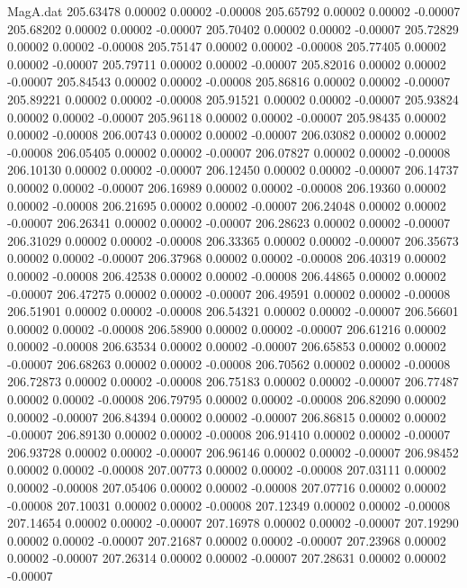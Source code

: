 \begin{filecontents}{MagA.dat}
 205.63478    0.00002    0.00002   -0.00008
 205.65792    0.00002    0.00002   -0.00007
 205.68202    0.00002    0.00002   -0.00007
 205.70402    0.00002    0.00002   -0.00007
 205.72829    0.00002    0.00002   -0.00008
 205.75147    0.00002    0.00002   -0.00008
 205.77405    0.00002    0.00002   -0.00007
 205.79711    0.00002    0.00002   -0.00007
 205.82016    0.00002    0.00002   -0.00007
 205.84543    0.00002    0.00002   -0.00008
 205.86816    0.00002    0.00002   -0.00007
 205.89221    0.00002    0.00002   -0.00008
 205.91521    0.00002    0.00002   -0.00007
 205.93824    0.00002    0.00002   -0.00007
 205.96118    0.00002    0.00002   -0.00007
 205.98435    0.00002    0.00002   -0.00008
 206.00743    0.00002    0.00002   -0.00007
 206.03082    0.00002    0.00002   -0.00008
 206.05405    0.00002    0.00002   -0.00007
 206.07827    0.00002    0.00002   -0.00008
 206.10130    0.00002    0.00002   -0.00007
 206.12450    0.00002    0.00002   -0.00007
 206.14737    0.00002    0.00002   -0.00007
 206.16989    0.00002    0.00002   -0.00008
 206.19360    0.00002    0.00002   -0.00008
 206.21695    0.00002    0.00002   -0.00007
 206.24048    0.00002    0.00002   -0.00007
 206.26341    0.00002    0.00002   -0.00007
 206.28623    0.00002    0.00002   -0.00007
 206.31029    0.00002    0.00002   -0.00008
 206.33365    0.00002    0.00002   -0.00007
 206.35673    0.00002    0.00002   -0.00007
 206.37968    0.00002    0.00002   -0.00008
 206.40319    0.00002    0.00002   -0.00008
 206.42538    0.00002    0.00002   -0.00008
 206.44865    0.00002    0.00002   -0.00007
 206.47275    0.00002    0.00002   -0.00007
 206.49591    0.00002    0.00002   -0.00008
 206.51901    0.00002    0.00002   -0.00008
 206.54321    0.00002    0.00002   -0.00007
 206.56601    0.00002    0.00002   -0.00008
 206.58900    0.00002    0.00002   -0.00007
 206.61216    0.00002    0.00002   -0.00008
 206.63534    0.00002    0.00002   -0.00007
 206.65853    0.00002    0.00002   -0.00007
 206.68263    0.00002    0.00002   -0.00008
 206.70562    0.00002    0.00002   -0.00008
 206.72873    0.00002    0.00002   -0.00008
 206.75183    0.00002    0.00002   -0.00007
 206.77487    0.00002    0.00002   -0.00008
 206.79795    0.00002    0.00002   -0.00008
 206.82090    0.00002    0.00002   -0.00007
 206.84394    0.00002    0.00002   -0.00007
 206.86815    0.00002    0.00002   -0.00007
 206.89130    0.00002    0.00002   -0.00008
 206.91410    0.00002    0.00002   -0.00007
 206.93728    0.00002    0.00002   -0.00007
 206.96146    0.00002    0.00002   -0.00007
 206.98452    0.00002    0.00002   -0.00008
 207.00773    0.00002    0.00002   -0.00008
 207.03111    0.00002    0.00002   -0.00008
 207.05406    0.00002    0.00002   -0.00008
 207.07716    0.00002    0.00002   -0.00008
 207.10031    0.00002    0.00002   -0.00008
 207.12349    0.00002    0.00002   -0.00008
 207.14654    0.00002    0.00002   -0.00007
 207.16978    0.00002    0.00002   -0.00007
 207.19290    0.00002    0.00002   -0.00007
 207.21687    0.00002    0.00002   -0.00007
 207.23968    0.00002    0.00002   -0.00007
 207.26314    0.00002    0.00002   -0.00007
 207.28631    0.00002    0.00002   -0.00007
\end{filecontents}
